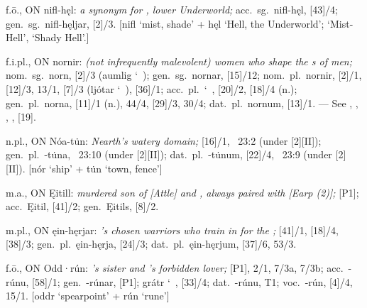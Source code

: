 \begin{itemize}
 f.ō., ON nifl-hęl:
  \emph{a synonym for , lower Underworld;} acc.~sg.~nifl-hęl, [43]/4; gen.~sg.~nifl-hęljar, [2]/3.
  [nifl ‘mist, shade’ + hęl ‘Hell, the Underworld’; ‘Mist-Hell’, ‘Shady Hell’.]

 f.i.pl., ON nornir:
  \emph{(not infrequently malevolent) women who shape the s of men;} nom.~sg.~norn, [2]/3 (aumlig \char`~); gen.~sg.~nornar, [15]/12;
  nom.~pl.~nornir, [2]/1, [12]/3, 13/1, [7]/3 (ljótar \char`~), [36]/1;
  acc.~pl.~\char`~, [20]/2, [18]/4 (n.);
  gen.~pl.~norna, [11]/1 (n.), 44/4, [29]/3, 30/4;
  dat.~pl.~nornum, [13]/1.
  --- See , , , , [19].

 n.pl., ON Nóa-tu̇n:
  \emph{Nearth’s watery domain;} [16]/1, \Gylfaginning~23:2 (under [2][II]); gen.~pl.~-tu̇na, \Gylfaginning~23:10 (under [2][II]); dat.~pl.~-tu̇num, [22]/4, \Gylfaginning~23:9 (under [2][II]).
  [nór ‘ship’ + tu̇n ‘town, fence’]

 m.a., ON Ęitill:
  \emph{murdered son of [Attle] and , always paired with [Earp (2)];} [P1]; acc.~Ęitil, [41]/2; gen.~Ęitils, [8]/2.

 m.pl., ON ęin-hęrjar:
  \emph{’s chosen warriors who train in  for the ;}  [41]/1, [18]/4, [38]/3; gen.~pl.~ęin-hęrja, [24]/3; dat.~pl.~ęin-hęrjum, [37]/6, 53/3.

 f.ō., ON Odd·rún:
  \emph{’s sister and ’s forbidden lover;} [P1], 2/1, 7/3a, 7/3b;
  acc.~-rúnu, [58]/1;
  gen.~-rúnar, [P1]; grátr \char`~, [33]/4;
  dat.~-rúnu,  T1;
  voc.~-rún, [4]/4, 15/1.
  [oddr ‘spearpoint’ + rún ‘rune’]


\end{itemize}
